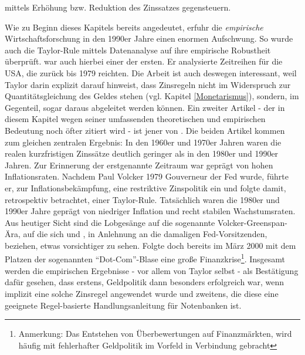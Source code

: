 mittels Erhöhung bzw. Reduktion des Zinssatzes gegensteuern. 

Wie zu Beginn dieses Kapitels bereits angedeutet, erfuhr die \textit{empirische} Wirtschaftsforschung in den 1990er Jahre einen enormen Aufschwung. So wurde auch die Taylor-Rule mittels Datenanalyse auf ihre empirische Robustheit überprüft. \textcite{Taylor1999} war auch hierbei einer der ersten. Er analysierte Zeitreihen für die USA, die zurück bis 1979 reichten. Die Arbeit ist auch deswegen interessant, weil Taylor darin explizit darauf hinweist, dass Zinsregeln nicht im Widerspruch zur Quantitätsgleichung des Geldes stehen (vgl. Kapitel \ref{Monetarismus}), sondern, im Gegenteil, sogar daraus abgeleitet werden können\parencite[S. 322f]{Taylor1999}. Ein zweiter Artikel - der in diesem Kapitel wegen seiner umfassenden theoretischen und empirischen Bedeutung noch öfter zitiert wird - ist jener von \textcite{Gali2000}. Die beiden Artikel kommen zum gleichen zentralen Ergebnis: In den 1960er und 1970er Jahren waren die realen kurzfristigen Zinssätze deutlich geringer als in den 1980er und 1990er Jahren. Zur Erinnerung der erstgenannte Zeitraum war geprägt von hohen Inflationsraten. Nachdem Paul Volcker 1979 Gouverneur der Fed wurde, führte er, zur Inflationsbekämpfung, eine restriktive Zinspolitik ein und folgte damit, retrospektiv betrachtet, einer Taylor-Rule. Tatsächlich waren die 1980er und 1990er Jahre geprägt von niedriger Inflation und recht stabilen Wachstumsraten.  Aus heutiger Sicht sind die Lobgesänge auf die sogenannte Volcker-Greenspan-Ära, auf die sich \textcite{Taylor1999} und \textcite{Gali2015}, in Anlehnung an die damaligen Fed-Vorsitzenden, beziehen, etwas vorsichtiger zu sehen. Folgte doch bereits im März 2000 mit dem Platzen der sogenannten "`Dot-Com"'-Blase eine große Finanzkrise\footnote{Anmerkung: Das Entstehen von Überbewertungen auf Finanzmärkten, wird häufig mit fehlerhafter Geldpolitik im Vorfeld in Verbindung gebracht}. Insgesamt werden die empirischen Ergebnisse - vor allem von Taylor selbst - als Bestätigung dafür gesehen, dass erstens, Geldpolitik dann besonders erfolgreich war, wenn implizit eine solche Zinsregel angewendet wurde und zweitens, die diese eine geeignete Regel-basierte Handlungsanleitung für Notenbanken ist.
